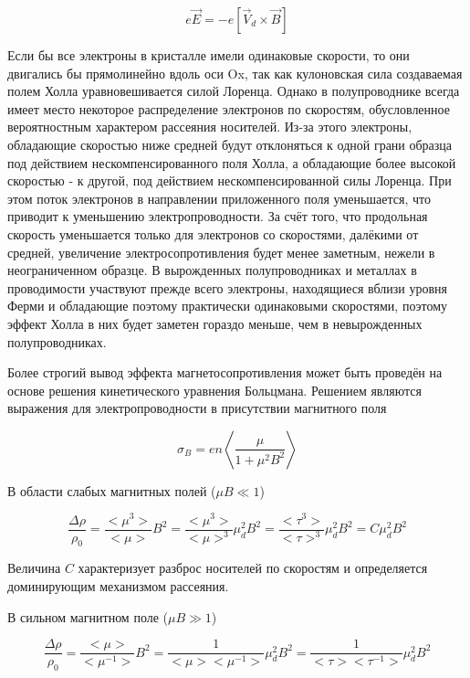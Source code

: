 \begin{equation}
e \overrightarrow{E} = -e \left[ \overrightarrow{V}_{d} \times \overrightarrow{B} \right]
\end{equation}

Если бы все электроны в кристалле имели одинаковые скорости, то они двигались бы прямолинейно вдоль оси Ox, так как кулоновская сила создаваемая полем Холла уравновешивается силой Лоренца. Однако в полупроводнике всегда имеет место некоторое распределение электронов по скоростям, обусловленное вероятностным характером рассеяния носителей. Из-за этого электроны, обладающие скоростью ниже средней будут отклоняться к одной грани образца под действием нескомпенсированного поля Холла, а обладающие более высокой скоростью - к другой, под действием нескомпенсированной силы Лоренца. При этом поток электронов в направлении приложенного поля уменьшается, что приводит к уменьшению электропроводности. За счёт того, что продольная скорость уменьшается только для электронов со скоростями, далёкими от средней, увеличение электросопротивления будет менее заметным, нежели в неограниченном образце. В вырожденных полупроводниках и металлах в проводимости участвуют прежде всего электроны, находящиеся вблизи уровня Ферми и обладающие поэтому практически одинаковыми скоростями, поэтому эффект Холла в них будет заметен гораздо меньше, чем в невырожденных полупроводниках.

Более строгий вывод эффекта магнетосопротивления может быть проведён на основе решения кинетического уравнения Больцмана. Решением являются выражения для электропроводности в присутствии магнитного поля

\begin{equation}
\sigma_{B} = e n \left< \frac{\mu}{1 + \mu^2 B^2} \right>
\end{equation}

В области слабых магнитных полей ($\mu B \ll 1$) 

\begin{equation}
\frac{\Delta \rho}{\rho_{0}} = \frac{<\mu^3>}{<\mu>} B^2 = \frac{<\mu^3>}{<\mu>^3}\mu^{2}_{d} B^2 = \frac{<\tau^3>}{<\tau>^3}\mu^{2}_{d} B^2 = C \mu^{2}_{d} B^2
\end{equation}

Величина $C$ характеризует разброс носителей по скоростям и определяется доминирующим механизмом рассеяния.

В сильном магнитном поле ($\mu B \gg 1$) 

\begin{equation}
\frac{\Delta \rho}{\rho_{0}} = \frac{<\mu>}{<\mu^{-1}>} B^2 = \frac{1}{<\mu><\mu^{-1}>} \mu_{d}^2 B^2 = \frac{1}{<\tau><\tau^{-1}>} \mu_{d}^2 B^2
\end{equation}

